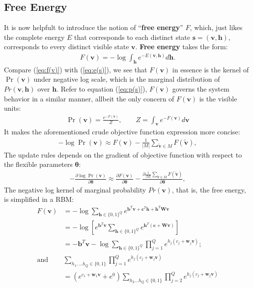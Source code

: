 \documentclass[11pt]{article}
\newcommand{\vb}{\boldsymbol{b}}
\newcommand{\vc}{\boldsymbol{c}}
\newcommand{\vh}{\boldsymbol{h}}
\newcommand{\vv}{\boldsymbol{v}}
\newcommand{\vw}{\boldsymbol{w}}
\newcommand{\vs}{\boldsymbol{s}}
\newcommand{\mw}{\boldsymbol{W}}
\newcommand{\vvt}{\tilde{\vv}}
\newcommand{\pEC}{\boldsymbol{\theta}}
\newcommand{\PDV}[2]{\frac{\partial #1}{\partial #2}}
\begin{document}
{\subsection{Free Energy}
It is now helpfult to introduce the notion of ``\textbf{free energy}'' $F$, which, just likes the complete energy $E$ that corresponds to each distinct state $\vs=(\vv, \vh)$, corresponds to every distinct visible state $\vv$. \textbf{Free energy} takes the form:
\begin{align}\label{eq:f(v)}
    F(\vv) = -\log{\int_{\vh}{e^{-E(\vv, \vh)}d\vh}}.
\end{align}
Compare (\ref{eq:f(v)}) with (\ref{eq:e(s)}), we see that $F(\vv)$ in essence is the kernel of $\Pr(\vv)$ under negative log scale, which is the marginal distribution of $Pr(\vv, \vh)$ over $\vh$. Refer to equation (\ref{eq:p(s)}), $F(\vv)$ governs the system behavior in a similar manner, allbeit the only concern of $F(\vv)$ is the visible units:
\begin{align}\label{eq:p(v)|fe}
    \Pr(\vv) = \frac{e^{-F(\vv)}}{Z}, \quad\quad Z=\int_{\vv}{e^{-F(\vv)}}d\vv
\end{align}
It makes the aforementioned crude objective function expression more concise:
\begin{align}\label{eq:l(v)3}
  -\log{\Pr(\vv)} \approx F(\vv) - \frac{1}{|M|}\sum_{\vvt \in M}{F(\vvt)},
\end{align}
The update rules depends on the gradient of objective function with respect to the flexible parameters $\pEC$:
\begin{align}\label{eq:gv4}
  -\PDV{\log{\Pr(\vv)}}{\pEC} \approx \PDV{F(\vv)}{\pEC} - \PDV{\frac{1}{|M|}\sum_{\vvt \in M}{F(\vvt)}}{\pEC},
\end{align}
The negative log kernel of marginal probability $Pr(\vv)$, that is, the free energy, is simplified in a RBM:
\begin{align*}
  F(\vv) &= -\log{\sum_{\vh\in \{0,1\}^Q}{e^{\vb^T \vv + \vc^T \vh + \vh^T \mw \vv}}} \\
         &= -\log{\left[ e^{\vb^T\vv}\sum_{\vh\in \{0,1\}^Q}{e^{\vh^T(\vc + \mw \vv)}} \right]} \\
         &= -\vb^T\vv - \log{\sum_{\vh\in \{0,1\}^Q}{ \prod_{j=1}^Q{e^{h_j(c_j + \vw_j\vv)}} }}; \\
  \textrm{and} \quad & \sum_{h_1, \dots h_Q \in \{0,1\}}{\prod_{j=1}^Q{e^{h_j(c_j + \vw_j\vv)}}} \\
         &= (e^{c_1+\vw_1\vv}+e^{0}) \sum_{h_2 \dots h_Q \in\{0,1\}}{ \prod_{j=2}^Q{e^{h_j(c_j + \vw_j\vv)}} } \\

\end{align*}}
\end{document}
